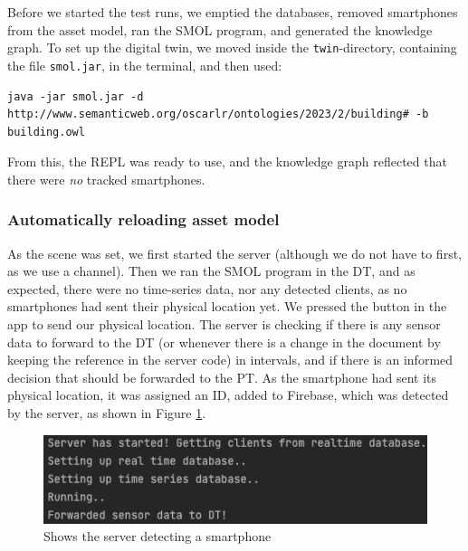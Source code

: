 \documentclass{article}
\begin{document}
Before we started the test runs, we emptied the databases, removed smartphones from the asset model, ran the SMOL program, and generated the knowledge graph. To set up the digital twin, we moved inside the \verb|twin|-directory, containing the file \verb|smol.jar|, in the terminal, and then used:

\begin{small}
\begin{Verbatim}[frame=single,commandchars=\\\{\}, breakanywhere=true,breaklines]
java -jar smol.jar -d http://www.semanticweb.org/oscarlr/ontologies/2023/2/building# -b building.owl
\end{Verbatim}
\end{small}
From this, the REPL was ready to use, and the knowledge graph reflected that there were \emph{no} tracked smartphones.

\subsubsection{Automatically reloading asset model}\label{subsubsec:automatically_reloading}
As the scene was set, we first started the server (although we do not have to first, as we use a channel). Then we ran the SMOL program in the DT, and as expected, there were no time-series data, nor any detected clients, as no smartphones had sent their physical location yet.
We pressed the button in the app to send our physical location. The server is checking if there is any sensor data to forward to the DT (or whenever there is a change in the document by keeping the reference in the server code) in intervals, and if there is an informed decision that should be forwarded to the PT. As the smartphone had sent its physical location, it was assigned an ID, added to Firebase, which was detected by the server, as shown in Figure \ref{fig:detected_by_server}.

\begin{figure}[H]
    \centering
    \includegraphics[scale=0.38]{graphics/detected_by_server.png}
    \caption{Shows the server detecting a smartphone}
    \label{fig:detected_by_server}
\end{figure}
\end{document}
